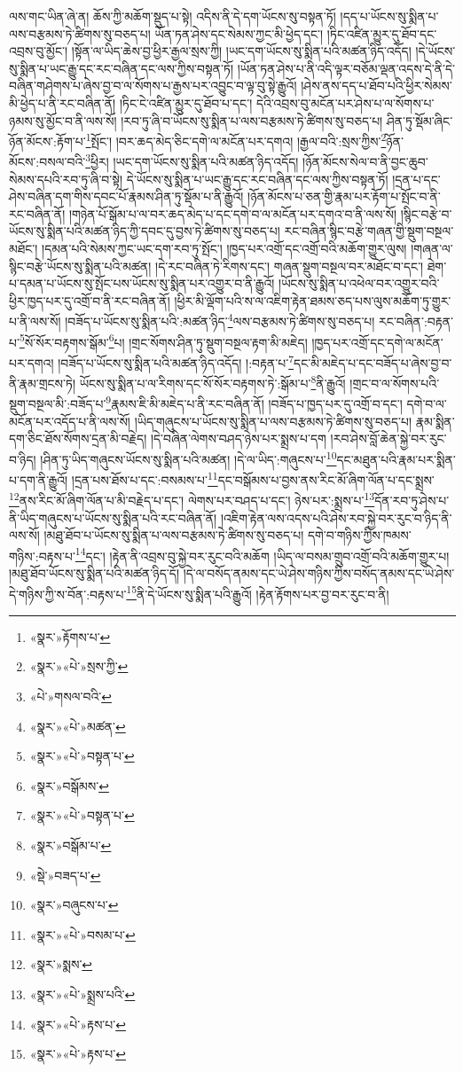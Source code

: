 ལས་གང་ཡིན་ཞེ་ན། ཆོས་ཀྱི་མཆོག་སྡུད་པ་སྟེ། འདིས་ནི་དེ་དག་ཡོངས་སུ་བསྟན་ཏོ། །དད་པ་ཡོངས་སུ་སྨིན་པ་ལས་བརྩམས་ཏེ་ཚིགས་སུ་བཅད་པ། ཡོན་ཏན་ཤེས་དང་སེམས་ཀྱང་མི་ཕྱེད་དང་། །ཏིང་འཛིན་མྱུར་དུ་ཐོབ་དང་འབྲས་བུ་མྱོང་། །སྟོན་ལ་ཡིད་ཆེས་བྱ་ཕྱིར་རྒྱལ་སྲས་ཀྱི། །ཡང་དག་ཡོངས་སུ་སྨིན་པའི་མཚན་ཉིད་འདོད། །དེ་ཡོངས་སུ་སྨིན་པ་ཡང་རྒྱུ་དང་རང་བཞིན་དང་ལས་ཀྱིས་བསྟན་ཏོ། །ཡོན་ཏན་ཤེས་པ་ནི་འདི་ལྟར་བཅོམ་ལྡན་འདས་དེ་ནི་དེ་བཞིན་གཤེགས་པ་ཞེས་བྱ་བ་ལ་སོགས་པ་རྒྱས་པར་འབྱུང་བ་ལྟ་བུ་སྟེ་རྒྱུའོ། །ཤེས་ནས་དད་པ་ཐོབ་པའི་ཕྱིར་སེམས་མི་ཕྱེད་པ་ནི་རང་བཞིན་ནོ། །ཏིང་ངེ་འཛིན་མྱུར་དུ་ཐོབ་པ་དང་། དེའི་འབྲས་བུ་མངོན་པར་ཤེས་པ་ལ་སོགས་པ་ཉམས་སུ་མྱོང་བ་ནི་ལས་སོ། །རབ་ཏུ་ཞི་བ་ཡོངས་སུ་སྨིན་པ་ལས་བརྩམས་ཏེ་ཚིགས་སུ་བཅད་པ། ཤིན་ཏུ་སྡོམ་ཞིང་ཉོན་མོངས་:རྟོག་པ་\footnote{«སྣར་»རྟོགས་པ་}སྤོང་། །བར་ཆད་མེད་ཅིང་དགེ་ལ་མངོན་པར་དགའ། །རྒྱལ་བའི་:སྲས་ཀྱིས་\footnote{«སྣར་»«པེ་»སྲས་ཀྱི་}ཉོན་མོངས་:བསལ་བའི་\footnote{«པེ་»གསལ་བའི་}ཕྱིར། །ཡང་དག་ཡོངས་སུ་སྨིན་པའི་མཚན་ཉིད་འདོད། །ཉོན་མོངས་སེལ་བ་ནི་བྱང་ཆུབ་སེམས་དཔའི་རབ་ཏུ་ཞི་བ་སྟེ། དེ་ཡོངས་སུ་སྨིན་པ་ཡང་རྒྱུ་དང་རང་བཞིན་དང་ལས་ཀྱིས་བསྟན་ཏོ། །དྲན་པ་དང་ཤེས་བཞིན་དག་གིས་དབང་པོ་རྣམས་ཤིན་ཏུ་སྡོམ་པ་ནི་རྒྱུའོ། །ཉོན་མོངས་པ་ཅན་གྱི་རྣམ་པར་རྟོག་པ་སྤོང་བ་ནི་རང་བཞིན་ནོ། །གཉེན་པོ་སྒོམ་པ་ལ་བར་ཆད་མེད་པ་དང་དགེ་བ་ལ་མངོན་པར་དགའ་བ་ནི་ལས་སོ། །སྙིང་བརྩེ་བ་ཡོངས་སུ་སྨིན་པའི་མཚན་ཉིད་ཀྱི་དབང་དུ་བྱས་ཏེ་ཚིགས་སུ་བཅད་པ། རང་བཞིན་སྙིང་བརྩེ་གཞན་གྱི་སྡུག་བསྔལ་མཐོང་། །དམན་པའི་སེམས་ཀྱང་ཡང་དག་རབ་ཏུ་སྤོང་། །ཁྱད་པར་འགྲོ་དང་འགྲོ་བའི་མཆོག་གྱུར་ལུས། །གཞན་ལ་སྙིང་བརྩེ་ཡོངས་སུ་སྨིན་པའི་མཚན། །དེ་རང་བཞིན་ཏེ་རིགས་དང་། གཞན་སྡུག་བསྔལ་བར་མཐོང་བ་དང་། ཐེག་པ་དམན་པ་ཡོངས་སུ་སྤོང་པས་ཡོངས་སུ་སྨིན་པར་འགྱུར་བ་ནི་རྒྱུའོ། །ཡོངས་སུ་སྨིན་པ་འཕེལ་བར་འགྱུར་བའི་ཕྱིར་ཁྱད་པར་དུ་འགྲོ་བ་ནི་རང་བཞིན་ནོ། །ཕྱིར་མི་ལྡོག་པའི་ས་ལ་འཇིག་རྟེན་ཐམས་ཅད་པས་ལུས་མཆོག་ཏུ་གྱུར་པ་ནི་ལས་སོ། །བཟོད་པ་ཡོངས་སུ་སྨིན་པའི་:མཚན་ཉིད་\footnote{«སྣར་»«པེ་»མཚན་}ལས་བརྩམས་ཏེ་ཚིགས་སུ་བཅད་པ། རང་བཞིན་:བརྟན་པ་\footnote{«སྣར་»«པེ་»བསྟན་པ་}སོ་སོར་བརྟགས་སྒོམ་\footnote{«སྣར་»བསྒོམས་}པ། །གྲང་སོགས་ཤིན་ཏུ་སྡུག་བསྔལ་རྟག་མི་མཇེད། །ཁྱད་པར་འགྲོ་དང་དགེ་ལ་མངོན་པར་དགའ། །བཟོད་པ་ཡོངས་སུ་སྨིན་པའི་མཚན་ཉིད་འདོད། །:བརྟན་པ་\footnote{«སྣར་»«པེ་»བསྟན་པ་}དང་མི་མཇེད་པ་དང་བཟོད་པ་ཞེས་བྱ་བ་ནི་རྣམ་གྲངས་ཏེ། ཡོངས་སུ་སྨིན་པ་ལ་རིགས་དང་སོ་སོར་བརྟགས་ཏེ་:སྒོམ་པ་\footnote{«སྣར་»བསྒོམ་པ་}ནི་རྒྱུའོ། །གྲང་བ་ལ་སོགས་པའི་སྡུག་བསྔལ་མི་:བཟོད་པ་\footnote{«སྡེ་»བཟད་པ་}རྣམས་ཇི་མི་མཇེད་པ་ནི་རང་བཞིན་ནོ། །བཟོད་པ་ཁྱད་པར་དུ་འགྲོ་བ་དང་། དགེ་བ་ལ་མངོན་པར་འདོད་པ་ནི་ལས་སོ། །ཡིད་གཞུངས་པ་ཡོངས་སུ་སྨིན་པ་ལས་བརྩམས་ཏེ་ཚིགས་སུ་བཅད་པ། རྣམ་སྨིན་དག་ཅིང་ཐོས་སོགས་དྲན་མི་བརྗེད། །དེ་བཞིན་ལེགས་བཤད་ཉེས་པར་སྨྲས་པ་དག །རབ་ཤེས་བློ་ཆེན་སྐྱེ་བར་རུང་བ་ཉིད། །ཤིན་ཏུ་ཡིད་གཞུངས་ཡོངས་སུ་སྨིན་པའི་མཚན། །དེ་ལ་ཡིད་:གཞུངས་པ་\footnote{«སྣར་»བཞུངས་པ་}དང་མཐུན་པའི་རྣམ་པར་སྨིན་པ་དག་ནི་རྒྱུའོ། །དྲན་པས་ཐོས་པ་དང་:བསམས་པ་\footnote{«སྣར་»«པེ་»བསམ་པ་}དང་བསྒོམས་པ་བྱས་ནས་རིང་མོ་ཞིག་ལོན་པ་དང་སྨྲས་\footnote{«སྣར་»སྨས་}ནས་རིང་མོ་ཞིག་ལོན་པ་མི་བརྗེད་པ་དང་། ལེགས་པར་བཤད་པ་དང་། ཉེས་པར་:སྨྲས་པ་\footnote{«སྣར་»«པེ་»སྨྲས་པའི་}དོན་རབ་ཏུ་ཤེས་པ་ནི་ཡིད་གཞུངས་པ་ཡོངས་སུ་སྨིན་པའི་རང་བཞིན་ནོ། །འཇིག་རྟེན་ལས་འདས་པའི་ཤེས་རབ་སྐྱེ་བར་རུང་བ་ཉིད་ནི་ལས་སོ། །མཐུ་ཐོབ་པ་ཡོངས་སུ་སྨིན་པ་ལས་བརྩམས་ཏེ་ཚིགས་སུ་བཅད་པ། དགེ་བ་གཉིས་ཀྱིས་ཁམས་གཉིས་:བརྟས་པ་\footnote{«སྣར་»«པེ་»རྟས་པ་}དང་། །རྟེན་ནི་འབྲས་བུ་སྐྱེ་བར་རུང་བའི་མཆོག །ཡིད་ལ་བསམ་གྲུབ་འགྲོ་བའི་མཆོག་གྱུར་པ། །མཐུ་ཐོབ་ཡོངས་སུ་སྨིན་པའི་མཚན་ཉིད་དོ། །དེ་ལ་བསོད་ནམས་དང་ཡེ་ཤེས་གཉིས་ཀྱིས་བསོད་ནམས་དང་ཡེ་ཤེས་དེ་གཉིས་ཀྱི་ས་བོན་:བརྟས་པ་\footnote{«སྣར་»«པེ་»རྟས་པ་}ནི་དེ་ཡོངས་སུ་སྨིན་པའི་རྒྱུའོ། །རྟེན་རྟོགས་པར་བྱ་བར་རུང་བ་ནི། 